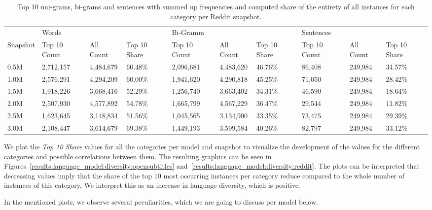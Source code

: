 \begin{table}[H]
	\centering
	\begin{adjustbox}{max width=\textwidth}
		\begin{tabular}{llllllllll}
			\toprule
			& Words &&&Bi-Gramm&&&Sentences&&\\
			Snapshot & Top 10 Count & All Count& Top 10 Share &  Top 10 Count& All Count& Top 10 Share &  Top 10 Count& All Count& Top 10 Share \\
			\midrule
			0.5M & 2,712,157	 & 4,484,679	 & 60.48\%	&2,096,681	&4,483,620	&46.76\%	&86,408	&249,984	&34.57\%\\
			1.0M & 2,576,291	 & 4,294,209	 & 60.00\%	&1,941,620	&4,290,818	&45.25\%	&71,050	&249,984	&28.42\%\\
			1.5M & 1,918,226	 & 3,668,416	 & 52.29\%	&1,256,740	&3,663,402	&34.31\%	&46,590	&249,984	&18.64\%\\
			2.0M & 2,507,930	 & 4,577,892	 & 54.78\%	&1,665,799	&4,567,229	&36.47\%	&29,544	&249,984	&11.82\%\\
			2.5M & 1,623,645	 & 3,148,834	 & 51.56\%	&1,045,565	&3,134,900	&33.35\%	&73,475	&249,984	&29.39\%\\
			3.0M & 2,108,447	 & 3,614,679	 & 69.38\%	&1,449,193	&3,599,584	&40.26\%	&82,797	&249,984	&33.12\%\\
			\bottomrule
		\end{tabular}
	\end{adjustbox}
	\caption{Top 10 uni-grams, bi-grams and sentences with summed up frequencies and computed share of the entirety of all instances for each category per Reddit snapshot.}
	\label{results:top_10_frequency:reddit}
\end{table}

We plot the \emph{Top 10 Share} values for all the categories per model and snapshot to visualize the development of the values for the different categories and possible correlations between them. The resulting graphics can be seen in Figures~\ref{results:language_model:diversity:opensubtitles} and~\ref{results:language_model:diversity:reddit}. The plots can be interpreted that decreasing values imply that the share of the top 10 most occurring instances per category reduce compared to the whole number of instances of this category. We interpret this as an increase in language diversity, which is positive.

In the mentioned plots, we observe several peculiarities, which we are going to discuss per model below.

